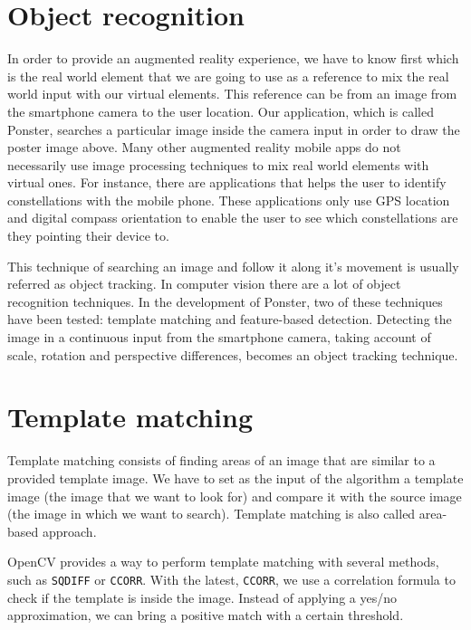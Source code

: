 \section{Object recognition}
In order to provide an augmented reality experience, we have to know first
which is the real world element that we are going to use as a reference to mix
the real world input with our virtual elements. This reference can be from an
image from the smartphone camera to the user location. Our application, which is
called Ponster, searches a
particular image inside the camera input in order to draw the poster image
above. Many other augmented reality mobile apps do not necessarily use image
processing techniques to mix real world elements with virtual ones. For
instance, there are applications that helps the user to identify constellations
with the mobile phone. These applications only use GPS location and digital
compass orientation to enable the user to see which constellations are they
pointing their device to.

This technique of searching an image and follow it along it's 
movement is usually referred as object tracking. 
In computer vision there are a lot of object recognition techniques. In the
development of Ponster, two of these techniques have been tested: template
matching and feature-based detection. Detecting the image in a continuous input from
the smartphone camera, taking account of scale, rotation and perspective
differences, becomes an object tracking technique. 

\section{Template matching}
Template matching\cite{ocv01} consists of finding areas of an image that are similar to a
provided template image. We have to set as the input of the algorithm a template image (the image that we want
to look for) and compare it with the source image (the image in which we want to
search)\cite{tmatch01}. Template matching is also called area-based approach.

OpenCV provides a way to perform template matching with several methods, such as
\texttt{SQDIFF} or \texttt{CCORR}. With the latest, \texttt{CCORR}, we use a
correlation formula to check if the template is inside the image. Instead of
applying a yes/no approximation, we can bring a positive match with a certain
threshold. 

